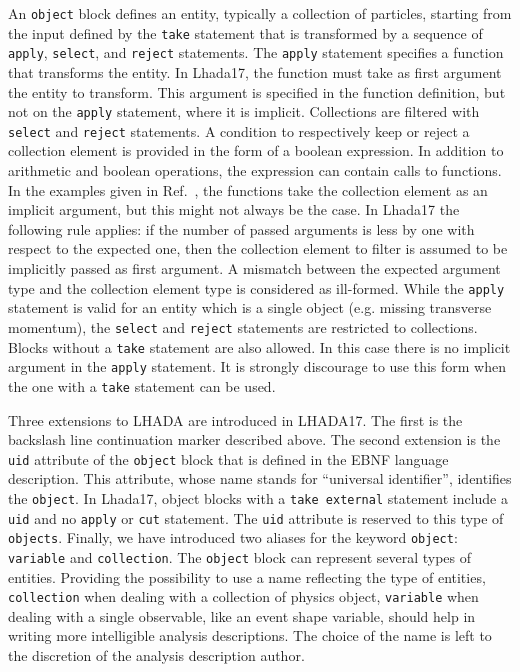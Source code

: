 \documentclass[11pt]{cernrep}
\begin{document}
An {\tt object} block defines an entity, typically a collection of particles, starting from the input defined by the {\tt take} statement that is transformed by a sequence of {\tt apply}, {\tt select}, and {\tt reject}  statements. The {\tt apply} statement specifies a function that transforms the entity. In {\sc Lhada17}, the function must take as first argument the entity to transform. This argument is specified in the function definition, but not on the {\tt apply} statement, where it is implicit. Collections are filtered with {\tt select} and {\tt reject} statements. A condition to respectively keep or reject a collection element is provided in the form of a boolean expression. In addition to arithmetic and boolean operations, the expression can contain calls to functions. In the examples given in Ref.~\cite{Brooijmans:2016vro}, the functions take the collection element as an implicit argument, but this might not always be the case. In {\sc Lhada17} the following rule applies: if the number of passed arguments is less by one with respect to the expected one, then the collection element to filter is assumed to be implicitly passed as first argument. A mismatch between the expected argument type and the collection element type is considered as ill-formed. While the {\tt apply} statement is valid for an entity which is a single object (e.g. missing transverse momentum), the {\tt select} and {\tt reject} statements are restricted to collections. Blocks without a {\tt take} statement are also allowed. In this case there is no implicit argument in the {\tt apply} statement. It is strongly discourage to use this form when the one with a {\tt take} statement can be used.

Three extensions to {\sc LHADA} are introduced in {\sc LHADA17}. The first is the backslash line continuation marker described above. The second extension is the {\tt uid} attribute of the {\tt object} block that is defined in the EBNF language description. This attribute, whose name stands for ``universal identifier'', identifies the {\tt object}. In {\sc Lhada17}, object blocks with a {\tt take external} statement include a {\tt uid} and no {\tt apply} or {\tt cut} statement. The {\tt uid} attribute is reserved to this type of {\tt objects}. Finally, we have introduced two aliases for the keyword {\tt object}: {\tt variable} and {\tt collection}. The {\tt object} block can represent several types of entities. Providing the possibility to use a name reflecting the type of entities, {\tt collection} when dealing with a collection of physics object, {\tt variable} when dealing with a single observable, like an event shape variable, should help in writing more intelligible analysis descriptions. The choice of the name is left to the discretion of the analysis description author.
\end{document}
